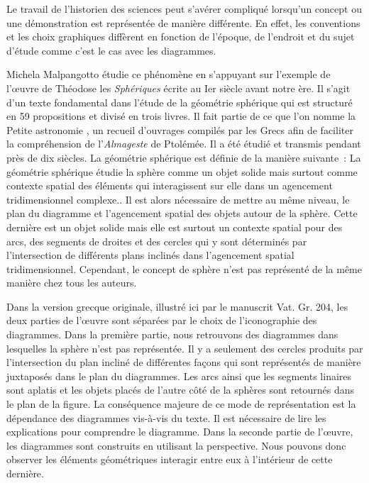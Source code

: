 Le travail de l'historien des sciences peut s'avérer compliqué lorsqu'un concept ou une démonstration est représentée de manière différente.
En effet, les conventions et les choix graphiques diffèrent en fonction de l'époque, de l'endroit et du sujet d'étude comme c'est le cas avec les diagrammes.

Michela Malpangotto étudie ce phénomène en s'appuyant sur l'exemple de l'œuvre de Théodose les \textit{Sphériques} écrite au Ier siècle avant notre ère.
Il s'agit d'un texte fondamental dans l'étude de la géométrie sphérique qui est structuré en 59 propositions et divisé en trois livres.
Il fait partie de ce que l'on nomme la \og Petite astronomie \fg, un recueil d'ouvrages compilés par les Grecs afin de faciliter la compréhension de l'\textit{Almageste} de Ptolémée.
Il a été étudié et transmis pendant près de dix siècles.
La géométrie sphérique est définie de la manière suivante~: \og La géométrie sphérique étudie la sphère comme un objet solide mais surtout comme contexte spatial des éléments qui interagissent sur elle dans un agencement tridimensionnel complexe.\fg.
Il est alors nécessaire de mettre au même niveau, le plan du diagramme et l'agencement spatial des objets autour de la sphère.
Cette dernière est un objet solide mais elle est surtout un contexte spatial pour des arcs, des segments de droites et des cercles qui y sont déterminés par l'intersection de différents plans inclinés dans l'agencement spatial tridimensionnel.
Cependant, le concept de sphère n'est pas représenté de la même manière chez tous les auteurs.

Dans la version grecque originale, illustré ici par le manuscrit Vat. Gr. 204, les deux parties de l'œuvre sont séparées par le choix de l'iconographie des diagrammes.
Dans la première partie, nous retrouvons des diagrammes dans lesquelles la sphère n'est pas représentée.
Il y a seulement des cercles produits par l'intersection du plan incliné de différentes façons qui sont représentés de manière juxtaposés dans le plan du diagrammes.
Les arcs ainsi que les segments linaires sont aplatis et les objets placés de l'autre côté de la sphères sont retournés dans le plan de la figure.
La conséquence majeure de ce mode de représentation est la dépendance des diagrammes vis-à-vis du texte.
Il est nécessaire de lire les explications pour comprendre le diagramme.
Dans la seconde partie de l'œuvre, les diagrammes sont construits en utilisant la perspective.
Nous pouvons donc observer les éléments géométriques interagir entre eux à l'intérieur de cette dernière.

